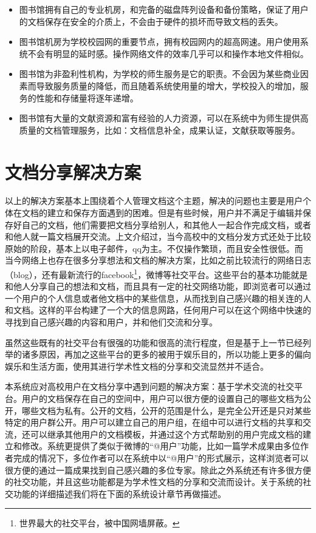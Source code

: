 \begin{itemize}
\item 图书馆拥有自己的专业机房，和完备的磁盘阵列设备和备份策略，保证了用户的文档保存在安全的介质上，不会由于硬件的损坏而导致文档的丢失。%
\item 图书馆机房为学校校园网的重要节点，拥有校园网内的超高网速。用户使用系统不会有明显的延时感。操作网络文件的效率几乎可以和操作本地文件相似。
\item 图书馆为非盈利性机构，为学校的师生服务是它的职责。不会因为某些商业因素而导致服务质量的降低，而且随着系统使用量的增大，学校投入的增加，服务的性能和存储量将逐年递增。
\item 图书馆有大量的文献资源和富有经验的人力资源，可以在系统中为师生提供高质量的文档管理服务，比如：文档信息补全，成果认证，文献获取等服务。
\end{itemize}

\section{文档分享解决方案}
\label{sec:giveout}

以上的解决方案基本上围绕着个人管理文档这个主题，解决的问题也主要是用户个体在文档的建立和保存方面遇到的困难。但是有些时候，用户并不满足于编辑并保存好自己的文档，他们需要把文档分享给别人，和其他人一起合作完成文档，或者和他人就一篇文档展开交流。上文介绍过，当今高校中的文档分发方式还处于比较原始的阶段，基本上以电子邮件，qq为主。不仅操作繁琐，而且安全性很低。而当今网络上也存在很多分享想法和文档的解决方案，比如之前比较流行的网络日志（blog），还有最新流行的facebook\footnote{世界最大的社交平台，被中国网墙屏蔽。}，微博等社交平台。这些平台的基本功能就是和他人分享自己的想法和文档，而且具有一定的社交网络功能，即浏览者可以通过一个用户的个人信息或者他文档中的某些信息，从而找到自己感兴趣的相关连的人和文档。这样的平台构建了一个大的信息网路，任何用户可以在这个网络中快速的寻找到自己感兴趣的内容和用户，并和他们交流和分享。

虽然这些既有的社交平台有很强的功能和很高的流行程度，但是基于上一节已经列举的诸多原因，再加之这些平台的更多的被用于娱乐目的，所以功能上更多的偏向娱乐和生活方面，使用其进行学术性文档的分享和交流显然并不适合。

本系统应对高校用户在文档分享中遇到问题的解决方案：基于学术交流的社交平台。用户的文档保存在自己的空间中，用户可以很方便的设置自己的哪些文档为公开，哪些文档为私有。公开的文档，公开的范围是什么，是完全公开还是只对某些特定的用户群公开。用户可以建立自己的用户组，在组中可以进行文档的共享和交流，还可以继承其他用户的文档模板，并通过这个方式帮助别的用户完成文档的建立和修改。系统更提供了类似于微博的“@用户”功能，比如一篇学术成果由多位作者完成的情况下，多位作者可以在系统中以“@用户”的形式展示，这样浏览者可以很方便的通过一篇成果找到自己感兴趣的多位专家。除此之外系统还有许多很方便的社交功能，并且这些功能都是为学术性文档的分享和交流而设计。关于系统的社交功能的详细描述我们将在下面的系统设计章节再做描述。

